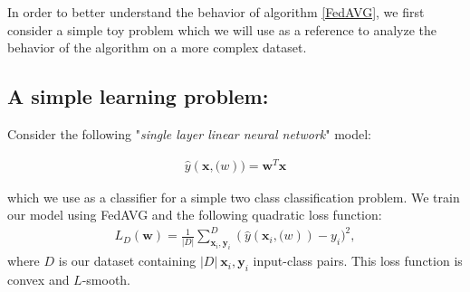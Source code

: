 In order to better understand the behavior of algorithm \ref{FedAVG}, we first consider a simple toy problem which we will use as a reference to analyze the behavior of the algorithm on a more complex dataset. 


\subsection{A simple learning problem:}

Consider the following "\textit{single layer linear neural network}" model:

\begin{align*}
    \hat{{y}}(\bm{x},\bm(w)) = \bm{w}^T \bm{x}
\end{align*}

which we use as a classifier for a simple two class classification problem. We train our model using FedAVG and the following quadratic loss function:
\begin{align*}
    L_D(\bm{w}) = \frac{1}{|D|} \sum_{\bm{x}_i,\bm{y}_i}^D (\hat{{y}}(\bm{x}_i,\bm(w)) - y_i)^2,
\end{align*}
where $D$ is our dataset containing $|D|~\bm{x}_i,\bm{y}_i$ input-class pairs. This loss function is convex and $L$-smooth.